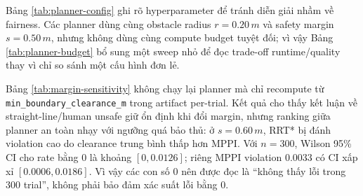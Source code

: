 \documentclass[10pt,letterpaper,twocolumn]{article}
\newcommand{\code}[1]{\texttt{#1}}
\begin{document}
\begin{table}[!t]
\centering
\footnotesize
\caption{Cấu hình chính của planner baseline.}
\label{tab:planner-config}
\end{table}

Bảng \ref{tab:planner-config} ghi rõ hyperparameter để tránh diễn giải nhầm về fairness. Các planner dùng cùng obstacle radius \(r=0.20\,m\) và safety margin \(s=0.50\,m\), nhưng không dùng cùng compute budget tuyệt đối; vì vậy Bảng \ref{tab:planner-budget} bổ sung một sweep nhỏ để đọc trade-off runtime/quality thay vì chỉ so sánh một cấu hình đơn lẻ.

\begin{table}[!t]
\centering
\footnotesize
\caption{Phân tích lại từ clearance đã lưu: violation khi đổi safety margin.}
\label{tab:margin-sensitivity}
\end{table}

Bảng \ref{tab:margin-sensitivity} không chạy lại planner mà chỉ recompute từ \code{min\_boundary\_clearance\_m} trong artifact per-trial. Kết quả cho thấy kết luận về straight-line/human unsafe giữ ổn định khi đổi margin, nhưng ranking giữa planner an toàn nhạy với ngưỡng quá bảo thủ: ở \(s=0.60\,m\), RRT* bị đánh violation cao do clearance trung bình thấp hơn MPPI. Với \(n=300\), Wilson 95\% CI cho rate bằng 0 là khoảng \([0,0.0126]\); riêng MPPI violation \(0.0033\) có CI xấp xỉ \([0.0006,0.0186]\). Vì vậy các con số 0 nên được đọc là ``không thấy lỗi trong 300 trial'', không phải bảo đảm xác suất lỗi bằng 0.
\end{document}
